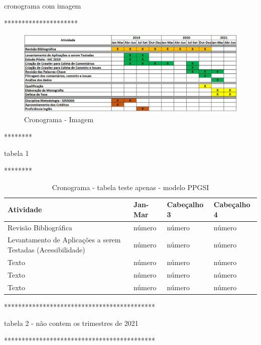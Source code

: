cronograma com imagem

*********************


\begin{figure}[!htb]
	\includegraphics[scale=0.55]{imagens/Cronograma-v1.jpg}
	\caption{Cronograma - Imagem}
	\label{fig:cronograma}
\end{figure}


********

tabela 1

********

\begin{table}[htbp]
	\centering
	\caption{Cronograma - tabela teste apenas - modelo PPGSI}
	\begin{tabular}{p{1in} p{1in} p{1in} p{1in} } \hline
		
		Atividade														& Jan-Mar	& Cabeçalho 3	& Cabeçalho 4 \\ \hline
		Revisão Bibliográfica											& número & número	& número \\ 
		Levantamento de Aplicações a serem Testadas (Acessibilidade)	& número & número	& número \\ 
		Texto	& número & número	& número \\ 
		Texto	& número & número	& número \\ 
		Texto	& número & número	& número \\ \hline
		
	\end{tabular}
	\label{tab:cronogramappgsi}
\end{table}


*******************************************

tabela 2 - não contem os trimestres de 2021

*******************************************



